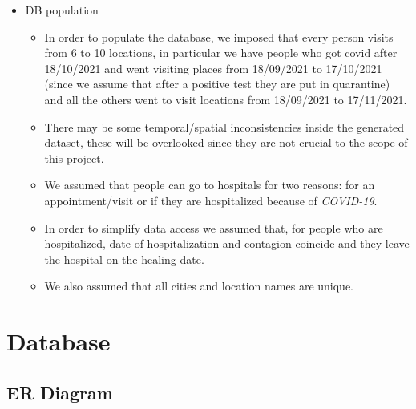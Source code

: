 \documentclass[12pt, a4paper]{article}
\begin{document}
\begin{itemize}
    \item DB population
    \begin{itemize}
        \item[] In order to populate the database, we imposed that every person 
            visits from 6 to 10 locations, in particular we have people who 
            got covid after 18/10/2021 and went visiting places from 18/09/2021 to 
            17/10/2021 (since we assume that after a positive test they are put 
            in quarantine) and all the others went to visit locations from 
            18/09/2021 to 17/11/2021. 
        \item[] There may be some temporal/spatial inconsistencies inside the 
            generated dataset, these will be overlooked since they are not 
            crucial to the scope of this project. 
        \item[] We assumed that people can go to hospitals for two reasons: for
            an appointment/visit or if they are hospitalized because of 
            \emph{COVID-19}.
        \item[] In order to simplify data access we assumed that, for people who
            are hospitalized, date of hospitalization and contagion coincide 
            and they leave the hospital on the healing date.
        \item[] We also assumed that all cities and location names are unique.
    \end{itemize}

\end{itemize}
  
\clearpage

\section{Database}

\subsection{ER Diagram}
\end{document}
